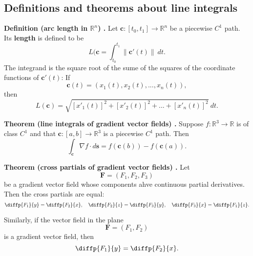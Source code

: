 \subsection{Definitions and theorems about line integrals}

\begin{shaded}
\textbf{Definition (arc length in $\mathbb{R}^n$) \cite{marsden_vector_calculus}.} Let $\mathbf{c}: [t_0, t_1] \to \mathbb{R}^n$ be a piecewise $C^1$ path. Its \textbf{length} is defined to be
$$ L(\mathbf{c} = \int_{t_0}^{t_1} \lVert \mathbf{c}'(t) \rVert \ dt . $$
The integrand is the square root of the sume of the squares of the coordinate functions of $\mathbf{c}'(t)$: If
$$ \mathbf{c}(t) = (x_1(t), x_2(t), ..., x_n(t)) , $$
then
$$ L(\mathbf{c}) = \sqrt{[x'_1(t)]^2 + [x'_2(t)]^2 + ... + [x'_n(t)]^2} \ dt . $$
\end{shaded}

\begin{shaded}
\textbf{Theorem (line integrals of gradient vector fields) \cite{marsden_vector_calculus}.} Suppose $f : \mathbb{R}^3 \to \mathbb{R}$ is of class $C^1$ and that $\mathbf{c} : [a, b] \to \mathbb{R}^3$ is a piecewise $C^1$ path. Then
$$ \int_{\mathbf{c}} \nabla f \cdot d\mathbf{s} = f(\mathbf{c}(b)) - f(\mathbf{c}(a)) . $$
\end{shaded}

\begin{shaded}
\textbf{Theorem (cross partials of gradient vector fields) \cite{math2111_notes}.} Let
$$ \mathbf{F} = (F_1, F_2, F_3) $$
be a gradient vector field whose components ahve continuous partial derivatives. Then the cross partials are equal:
$$ \diffp{F_1}{y} = \diffp{F_2}{x}, \quad \diffp{F_2}{z} = \diffp{F_3}{y}, \quad \diffp{F_3}{x} = \diffp{F_1}{z} . $$

Similarly, if the vector field in the plane
$$ \mathbf{F} = (F_1, F_2) $$
is a gradient vector field, then
$$ \diffp{F_1}{y} = \diffp{F_2}{x} . $$
\end{shaded}

